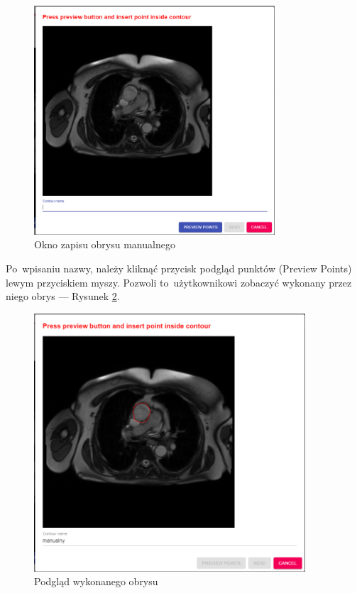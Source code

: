 \documentclass[a4paper,11pt,twoside,openright]{report}
\theoremstyle{definition}
\begin{document}
\begin{figure}[h!]
	\center
	\includegraphics[width=0.8\textwidth]{6}
	\caption{Okno zapisu obrysu manualnego}
    	\label{fig:6}
\end{figure}

 Po~wpisaniu nazwy, należy kliknąć przycisk podgląd punktów (Preview Points)
 lewym przyciskiem myszy. Pozwoli to~użytkownikowi zobaczyć wykonany przez niego
 obrys --- Rysunek \ref{fig:7}.

 \pagebreak

\begin{figure}[h!]
	\center
	\includegraphics[width=0.9\textwidth]{7}
	\caption{Podgląd wykonanego obrysu}
    	\label{fig:7}
\end{figure}
\end{document}

